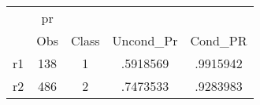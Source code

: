 \begin{tabular}{l*{4}{c}}
\hline\hline
            &          pr&            &            &            \\
            &         Obs&       Class&   Uncond\_Pr&     Cond\_PR\\
\hline
r1          &         138&           1&    .5918569&    .9915942\\
r2          &         486&           2&    .7473533&    .9283983\\
\hline\hline
\end{tabular}
